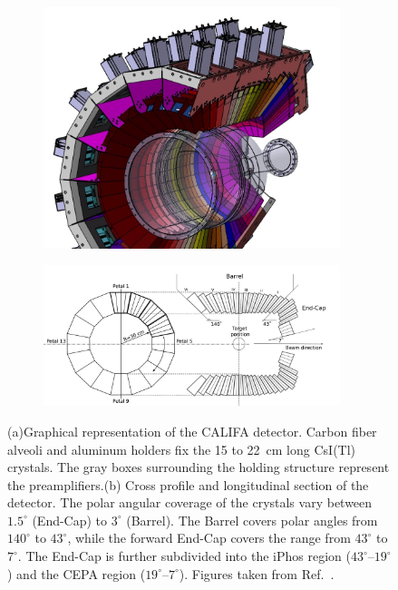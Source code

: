 \documentclass[review,sort&compress]{elsarticle}
\begin{document}
\begin{figure}
\centering
\begin{subfigure}{.5\textwidth}
  \centering
  \includegraphics[width=0.95\textwidth]{califa_drawing.png}
  \caption{}
  \label{fig:sub1}
\end{subfigure}%
\begin{subfigure}{.5\textwidth}
  \centering
  \includegraphics[width=0.95\textwidth]{califa_drawing_side.png}
  \caption{}
  \label{fig:sub2}
\end{subfigure}
\caption{(a)Graphical representation of the CALIFA detector. Carbon fiber alveoli and aluminum holders fix the 15 to 22~cm long CsI(Tl) crystals. The gray boxes surrounding the holding structure represent the preamplifiers.(b) Cross profile and longitudinal section of the detector. The polar angular coverage of the crystals vary between $1.5^\circ$ (End-Cap) to $3^\circ$ (Barrel). The Barrel covers polar angles from $140^{\circ}$ to $43^{\circ}$, while the forward End-Cap covers the range from $43^{\circ}$ to $7^{\circ}$. The End-Cap is further subdivided into the iPhos region ($43^{\circ}$--$19^{\circ}$) and the CEPA region ($19^{\circ}$--$7^{\circ}$). Figures taken from Ref.~\cite{cabanelas2020commissioning}.}
\label{fig:califa_setup}
\end{figure}
\end{document}

